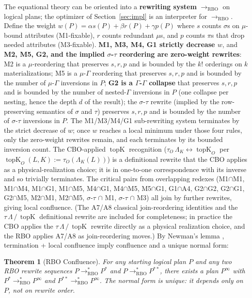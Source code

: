 \documentclass[acmsmall,review,anonymous]{acmart}
\theoremstyle{plain}
\newtheorem{theorem}{Theorem}
\theoremstyle{definition}
\newcommand{\topK}{\operatorname{topK}}
\theoremstyle{remark}
\begin{document}
The equational theory can be oriented into a \textbf{rewriting
system} $\to_{\mathrm{RBO}}$ on logical plans; the optimizer of
Section~\ref{sec:impl} is an interpreter for $\to_{\mathrm{RBO}}$.
Define the weight $w(P) = \alpha s(P) + \beta r(P) + \gamma p(P)$
where $s$ counts $\sigma$s on $\mu$-bound attributes
(M1-fixable), $r$ counts redundant $\mu$s, and $p$ counts $\pi$s
that drop needed attributes (M3-fixable). \textbf{M1, M3, M4, G1
strictly decrease $w$}, and \textbf{M2, M5, G2, and the implied
$\sigma$-$\tau$ reordering are zero-weight rewrites}: M2 is a
$\mu$-reordering that preserves $s, r, p$ and is bounded by the
$k!$ orderings on $k$ materializations; M5 is a $\mu$-$\Gamma$
reordering that preserves $s, r, p$ and is bounded by the number
of $\mu$-$\Gamma$ inversions in $P$; \textbf{G2 is a
$\Gamma$-$\Gamma$ collapse} that preserves $s, r, p$ and is
bounded by the number of nested-$\Gamma$ inversions in $P$ (one
collapse per nesting, hence the depth $d$ of the result); the
$\sigma$-$\tau$ rewrite (implied by the row-preserving semantics
of $\sigma$ and $\tau$) preserves $s, r, p$ and is bounded by the
number of $\sigma$-$\tau$ inversions in $P$. The M1/M3/M4/G1
sub-rewriting system terminates by the strict decrease of $w$;
once $w$ reaches a local minimum under those four rules, only
the zero-weight rewrites remain, and each terminates by its
bounded inversion count. The CBO-applied $\topK$ recognition
($\tau_O\,\Lambda_K \leftrightarrow \topK_O$ per
$\topK_O(L, K) := \tau_O(\Lambda_K(L))$) is a definitional
rewrite that the CBO applies as a physical-realization choice;
it is in one-to-one correspondence with its inverse and so
trivially terminates. The critical pairs from overlapping redexes
(M1$\cap$M1, M1$\cap$M4, M1$\cap$G1, M1$\cap$M5,
M4$\cap$G1, M4$\cap$M5, M5$\cap$G1, G1$\cap$A4, G2$\cap$G2,
G2$\cap$G1, G2$\cap$M5, M2$\cap$M1, M2$\cap$M5, $\sigma$-$\tau$
$\cap$ M1, $\sigma$-$\tau$ $\cap$ M3) all join by further
rewrites, giving local confluence. (The A7/A8 classical
join-reordering identities and the $\tau\,\Lambda\,/\,\topK$
definitional rewrite are included for completeness; in practice
the CBO applies the $\tau\,\Lambda\,/\,\topK$ rewrite directly as
a physical realization choice, and the RBO applies A7/A8 as
join-reordering moves.) By Newman's lemma \cite{newman1942},
termination + local confluence imply confluence and a unique
normal form:

\begin{theorem}[RBO Confluence]\label{thm:rbo-confluence}
For any starting logical plan $P$ and any two RBO rewrite sequences
$P \to^*_{\mathrm{RBO}} P^*$ and $P \to^*_{\mathrm{RBO}} P^{**}$,
there exists a plan $P^\infty$ with $P^* \to^*_{\mathrm{RBO}}
P^\infty$ and $P^{**} \to^*_{\mathrm{RBO}} P^\infty$. The normal
form is unique: it depends only on $P$, not on rewrite order.
\end{theorem}
\end{document}

